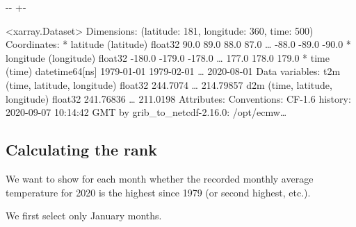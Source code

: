 \documentclass[letterpaper,10pt,english]{sphinxmanual}
\newlength\nbsphinxcodecellspacing
\begin{document}
{

\kern-\sphinxverbatimsmallskipamount\kern-\baselineskip
\kern+\FrameHeightAdjust\kern-\fboxrule
\vspace{\nbsphinxcodecellspacing}

\begin{sphinxVerbatim}[commandchars=\\\{\}]
\llap{\color{nbsphinxout}[14]:\,\hspace{\fboxrule}\hspace{\fboxsep}}<xarray.Dataset>
Dimensions:    (latitude: 181, longitude: 360, time: 500)
Coordinates:
  * latitude   (latitude) float32 90.0 89.0 88.0 87.0 {\ldots} -88.0 -89.0 -90.0
  * longitude  (longitude) float32 -180.0 -179.0 -178.0 {\ldots} 177.0 178.0 179.0
  * time       (time) datetime64[ns] 1979-01-01 1979-02-01 {\ldots} 2020-08-01
Data variables:
    t2m        (time, latitude, longitude) float32 244.7074 {\ldots} 214.79857
    d2m        (time, latitude, longitude) float32 241.76836 {\ldots} 211.0198
Attributes:
    Conventions:  CF-1.6
    history:      2020-09-07 10:14:42 GMT by grib\_to\_netcdf-2.16.0: /opt/ecmw{\ldots}
\end{sphinxVerbatim}
}


\subsection{Calculating the rank}
\label{\detokenize{Notebooks/Global_monthly_temperature_records_ERA5:Calculating-the-rank}}
We want to show for each month whether the recorded monthly average temperature for 2020 is the highest since 1979 (or second highest, etc.).

We first select only January months.

{
\begin{sphinxVerbatim}[commandchars=\\\{\}]
\llap{\color{nbsphinxin}[15]:\,\hspace{\fboxrule}\hspace{\fboxsep}}  \PYG{p}{[}\PYG{p}{]}   
\end{sphinxVerbatim}
}
\end{document}
